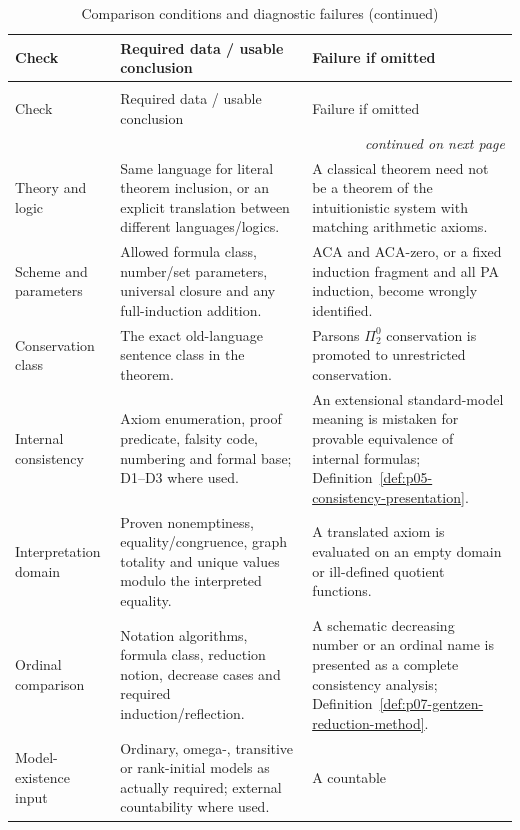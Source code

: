 \begingroup\small
\begin{longtable}{@{}p{}p{}p{}@{}}
\caption{Comparison conditions and diagnostic failures.}
\label{tab:p14-strength-conditions}\\
\toprule
Check & Required data / usable conclusion & Failure if omitted \\
\midrule
\endfirsthead
\caption[]{Comparison conditions and diagnostic failures (continued)}\\
\toprule
Check & Required data / usable conclusion & Failure if omitted \\
\midrule
\endhead
\midrule\multicolumn{3}{r}{\emph{continued on next page}}\\
\endfoot
\endlastfoot
Theory and logic & Same language for literal theorem inclusion, or an explicit
translation between different languages/logics. & A classical theorem need
not be a theorem of the intuitionistic system with matching arithmetic axioms. \\
\addlinespace
Scheme and parameters & Allowed formula class, number/set parameters,
universal closure and any full-induction addition. & ACA and ACA-zero,
or a fixed induction fragment and all PA induction, become wrongly identified. \\
\addlinespace
Conservation class & The exact old-language sentence class in the theorem. &
Parsons \(\Pi^0_2\) conservation is promoted to unrestricted conservation. \\
\addlinespace
Internal consistency & Axiom enumeration, proof predicate, falsity code,
numbering and formal base; D1--D3 where used. & An extensional standard-model
meaning is mistaken for provable equivalence of internal formulas;
Definition~\ref{def:p05-consistency-presentation}. \\
\addlinespace
Interpretation domain & Proven nonemptiness, equality/congruence, graph
totality and unique values modulo the interpreted equality. & A translated
axiom is evaluated on an empty domain or ill-defined quotient functions. \\
\addlinespace
Ordinal comparison & Notation algorithms, formula class, reduction notion,
decrease cases and required induction/reflection. & A schematic decreasing
number or an ordinal name is presented as a complete consistency analysis;
Definition~\ref{def:p07-gentzen-reduction-method}. \\
\addlinespace
Model-existence input & Ordinary, omega-, transitive or rank-initial models
as actually required; external countability where used. & A countable

\end{longtable}
